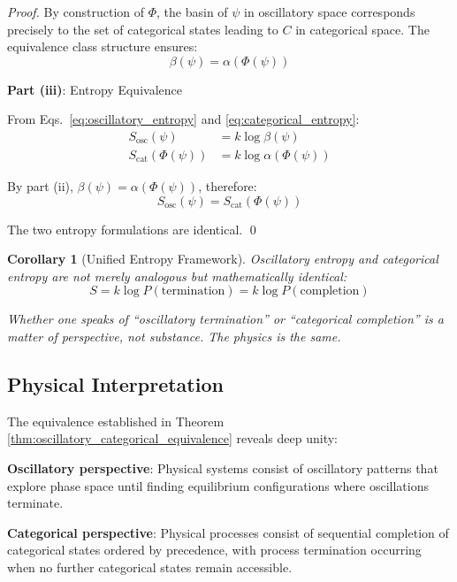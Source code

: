\documentclass[11pt]{article}
\newtheorem{corollary}[theorem]{Corollary}
\theoremstyle{remark}
\begin{document}
\begin{proof}
By construction of $\Phi$, the basin of $\psi$ in oscillatory space corresponds precisely to the set of categorical states leading to $C$ in categorical space. The equivalence class structure ensures:
\begin{equation}
\beta(\psi) = \alpha(\Phi(\psi))
\end{equation}

\textbf{Part (iii)}: Entropy Equivalence

From Eqs.~\eqref{eq:oscillatory_entropy} and \eqref{eq:categorical_entropy}:
\begin{align}
S_{\text{osc}}(\psi) &= k \log \beta(\psi) \\
S_{\text{cat}}(\Phi(\psi)) &= k \log \alpha(\Phi(\psi))
\end{align}

By part (ii), $\beta(\psi) = \alpha(\Phi(\psi))$, therefore:
\begin{equation}
S_{\text{osc}}(\psi) = S_{\text{cat}}(\Phi(\psi))
\end{equation}

The two entropy formulations are identical. \qed
\end{proof}

\begin{corollary}[Unified Entropy Framework]
\label{cor:unified_entropy}
Oscillatory entropy and categorical entropy are not merely analogous but mathematically identical:
\begin{equation}
S = k \log P(\text{termination}) = k \log P(\text{completion})
\end{equation}

Whether one speaks of ``oscillatory termination'' or ``categorical completion'' is a matter of perspective, not substance. The physics is the same.
\end{corollary}

\subsection{Physical Interpretation}

The equivalence established in Theorem \ref{thm:oscillatory_categorical_equivalence} reveals deep unity:

\textbf{Oscillatory perspective}: Physical systems consist of oscillatory patterns that explore phase space until finding equilibrium configurations where oscillations terminate.

\textbf{Categorical perspective}: Physical processes consist of sequential completion of categorical states ordered by precedence, with process termination occurring when no further categorical states remain accessible.
\end{document}
